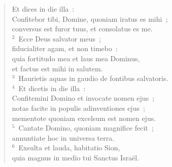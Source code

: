 \begin{flushleft}\begin{verse}\vspace{-19pt}\hspace{6pt}Et dices in die illa~:\\\hspace{6pt} Confitebor tibi, Domine, quoniam iratus es mihi~;\\ conversus est furor tuus, et consolatus es me.\\
${}^{2}$~Ecce Deus salvator meus~;\\ fiducialiter agam, et non timebo~:\\ quia fortitudo mea et laus mea Dominus,\\ et factus est mihi in salutem.\\
${}^{3}$~Haurietis aquas in gaudio de fontibus salvatoris.\\
${}^{4}$~Et dicetis in die illa~:\\ Confitemini Domino et invocate nomen ejus~;\\ notas facite in populis adinventiones ejus~;\\ mementote quoniam excelsum est nomen ejus.\\
${}^{5}$~Cantate Domino, quoniam magnifice fecit~;\\ annuntiate hoc in universa terra.\\
${}^{6}$~Exsulta et lauda, habitatio Sion,\\ quia magnus in medio tui Sanctus Isra\"el.\end{verse}\end{flushleft}


